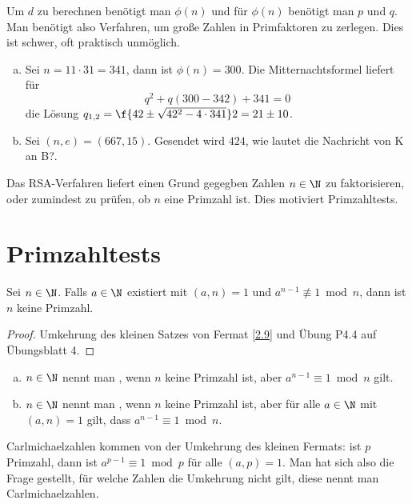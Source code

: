 Um $d$ zu berechnen benötigt man $\phi(n)$ und für $\phi(n)$ benötigt man $p$ und $q$.
Man benötigt also Verfahren, um große Zahlen in Primfaktoren zu zerlegen.
Dies ist schwer, oft praktisch unmöglich.



\begin{ex} \label{3.4}
	\begin{enumerate}[a)]
		\item
			Sei $n = 11 \cdot 31 = 341$, dann ist $\phi(n) = 300$.
			Die Mitternachtsformel liefert für
			\[
				q^2 + q(300 - 342) + 341 = 0
			\]
			die Lösung $q_{1,2} = \f{42 \pm \sqrt{42^2 - 4\cdot 341}}2 = 21 \pm 10$.
		\item
			Sei $(n, e) = (667, 15)$.
			Gesendet wird $424$, wie lautet die Nachricht von K an B?.
	\end{enumerate}
\end{ex}

Das RSA-Verfahren liefert einen Grund gegegben Zahlen $n \in \N$ zu faktorisieren, oder zumindest zu prüfen, ob $n$ eine Primzahl ist.
Dies motiviert Primzahltests.

\section{Primzahltests}

\begin{prop} \label{3.5}
	Sei $n \in \N$.
	Falls $a \in \N$ existiert mit $(a,n) = 1$ und $a^{n-1} \not\equiv 1 \bmod n$, dann ist $n$ keine Primzahl.
	\begin{proof}
		Umkehrung des kleinen Satzes von Fermat \ref{2.9} und Übung P4.4 auf Übungsblatt 4.
	\end{proof}
\end{prop}

\begin{df} \label{3.6}
	\begin{enumerate}[a)]
		\item
			$n \in \N$ nennt man , wenn $n$ keine Primzahl ist, aber $a^{n-1} \equiv 1 \bmod n$ gilt.
		\item
			$n \in \N$ nennt man , wenn $n$ keine Primzahl ist, aber für alle $a \in \N$ mit $(a,n) = 1$ gilt, dass $a^{n-1} \equiv 1 \bmod n$.
	\end{enumerate}
	\begin{note}
		Carlmichaelzahlen  kommen von der Umkehrung des kleinen Fermats: ist $p$ Primzahl, dann ist $a^{p-1} \equiv 1 \bmod p$ für alle $(a,p) = 1$.
		Man hat sich also die Frage gestellt, für welche Zahlen die Umkehrung nicht gilt, diese nennt man Carlmichaelzahlen.
	\end{note}
\end{df}

